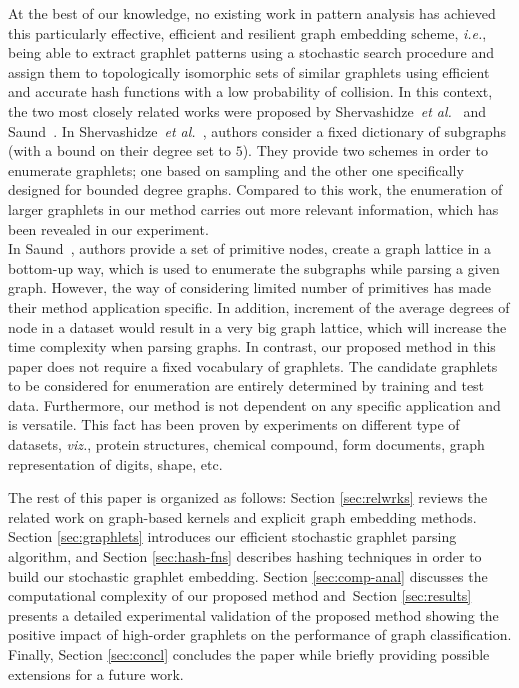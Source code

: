 \documentclass[journal]{IEEEtran}
\theoremstyle{definition}
\newcommand{\etal}{\textit{et al.}}
\newcommand{\ie}{\textit{i.e.}}
\newcommand{\viz}{\textit{viz.}}
\newcommand{\sect}[1]{Section \ref{#1}}
\begin{document}
At the best of our knowledge, no existing work in pattern analysis has achieved this particularly effective, efficient and resilient graph embedding scheme, \ie, being able to extract graphlet patterns using a stochastic search procedure and assign them to topologically isomorphic sets of similar graphlets using efficient and accurate hash functions with a low probability of collision. In this context, the two most closely related works were proposed by Shervashidze~\etal~\cite{Shervashidze2009} and Saund~\cite{Saund2013}. In Shervashidze~\etal~\cite{Shervashidze2009}, authors consider a fixed dictionary of subgraphs (with a bound on their degree set to $5$). They provide two schemes in order to enumerate graphlets; one based on sampling and the other one specifically designed for bounded degree graphs. Compared to this work, the enumeration of larger graphlets in our method carries out more relevant information, which has been revealed in our experiment.\\ 
\noindent In Saund~\cite{Saund2013}, authors provide a set of primitive nodes, create a graph lattice in a bottom-up way, which is used to enumerate the subgraphs while parsing a given graph. However, the way of considering limited number of primitives has made their method application specific. In addition, increment of the average degrees of node in a dataset would result in a very big graph lattice, which will increase the time complexity when parsing graphs. In contrast, our proposed method in this paper does not require a fixed vocabulary of graphlets. The candidate graphlets to be considered for enumeration are entirely determined by training and test data. Furthermore, our method is not dependent on any specific application and is versatile. This fact has been proven by experiments on different type of datasets, \viz, protein structures, chemical compound, form documents, graph representation of digits, shape, etc.

The rest of this paper is organized as follows: \sect{sec:relwrks} reviews the related work on graph-based kernels and explicit graph embedding methods. \sect{sec:graphlets} introduces our efficient stochastic graphlet parsing algorithm, and \sect{sec:hash-fns} describes hashing techniques in order to build our stochastic graphlet embedding. \sect{sec:comp-anal} discusses the computational complexity of our proposed method and~\sect{sec:results} presents a detailed experimental validation of the proposed method showing the positive impact of high-order graphlets on the performance of graph classification. Finally, \sect{sec:concl} concludes the paper while briefly providing possible extensions for a future work. 
\end{document}
